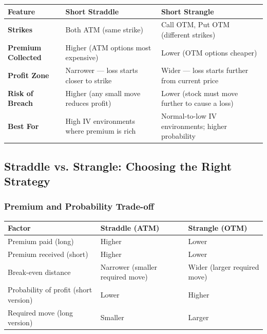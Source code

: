 \documentclass[12pt,openany]{book}
\begin{document}
\begin{center}
\scriptsize
\setlength{\tabcolsep}{3pt}
\begin{tabular}{|L{4.42cm}|L{4.42cm}|L{4.42cm}|}
\hline
Feature & Short Straddle & Short Strangle \\
\hline
\textbf{Strikes} & Both ATM (same strike) & Call OTM, Put OTM (different strikes) \\
\hline
\textbf{Premium Collected} & Higher (ATM options most expensive) & Lower (OTM options cheaper) \\
\hline
\textbf{Profit Zone} & Narrower — loss starts closer to strike & Wider — loss starts further from current price \\
\hline
\textbf{Risk of Breach} & Higher (any small move reduces profit) & Lower (stock must move further to cause a loss) \\
\hline
\textbf{Best For} & High IV environments where premium is rich & Normal-to-low IV environments; higher probability \\
\hline
\end{tabular}
\end{center}



\subsection{Straddle vs. Strangle: Choosing the Right Strategy}

\subsubsection{Premium and Probability Trade-off}

\begin{center}
\scriptsize
\setlength{\tabcolsep}{3pt}
\begin{tabular}{|L{4.42cm}|L{4.42cm}|L{4.42cm}|}
\hline
Factor & Straddle (ATM) & Strangle (OTM) \\
\hline
Premium paid (long) & Higher & Lower \\
\hline
Premium received (short) & Higher & Lower \\
\hline
Break-even distance & Narrower (smaller required move) & Wider (larger required move) \\
\hline
Probability of profit (short version) & Lower & Higher \\
\hline
Required move (long version) & Smaller & Larger \\
\hline
\end{tabular}
\end{center}
\end{document}
